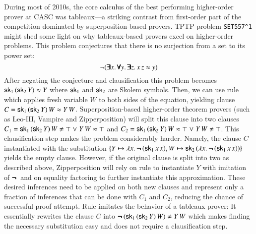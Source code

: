 During most of 2010s, the core calculus of the best performing
higher-order prover at CASC was tableaux---a striking contrast from first-order part
of the competition dominated by superposition-based provers. TPTP
problem \verb|SET557^1| might shed some light on why tableaux-based provers
excel on higher-order problems.
This problem conjectures that there is
no surjection from a set to its power set: 
$$ \neg (\pmb{\exists} x. \, \pmb{\forall} y. \,
\pmb{\exists} z. \, x \, z \approx y) $$ 
After negating the conjecture and
clausification this problem becomes $ \mathsf{sk}_1 \, (\mathsf{sk}_2 \, Y) \approx Y   $
where $\mathsf{sk}_1$ and $\mathsf{sk}_2$ are Skolem symbols. Then, we can use
 rule \cite{bbtvw-21-sup-lam} which applies
fresh variable $W$ to both sides of the equation, yielding clause $ C = \mathsf{sk}_1 \, (\mathsf{sk}_2 \, Y) \, W
\approx Y \, W$. Superposition-based higher-order theorem
provers (such as Leo-III, Vampire and Zipperposition) will split this clause
into two clauses $C_1 = \cst{sk}_1 \, (\cst{sk}_2 \, Y) \, W \not\eq \top \llor Y
\, W \eq \top $ and $ C_2 =  \cst{sk}_1 \, (\cst{sk}_2 \, Y) \, W \eq \top \llor
Y \, W \not\eq \top $. This clausification step makes the problem
considerably harder. Namely, the clause $C$ instantiated with the substitution $
\{ Y \mapsto \lambda x.\> \pmb{\neg\,} (\mathsf{sk}_1 \, x \, x), W \mapsto \mathsf{sk}_2 \,
(\lambda x.\> \pmb{\neg\,} (\mathsf{sk}_1 \, x \, x)) \} $ yields the empty clause. However,
if the original clause is split into two as described above, Zipperposition will
rely on  rule to instantiate $Y$ with imitation of $\pmb{\neg\,}$ and on
equality factoring to further instantiate this approximation. These desired
inferences need to be applied on both new clauses and represent only a fraction
of inferences that can be done with $C_1$ and $C_2$, reducing the chance of
successful proof attempt. Rule  imitates the behavior of
a tableaux prover: It essentially rewrites the clause $C$ into $ \inot (\cst{sk}_1 \,
(\cst{sk}_2 \, Y) \, W) \not\eq Y \, W $ which makes finding the necessary substitution easy and
does not require a clausification step.

